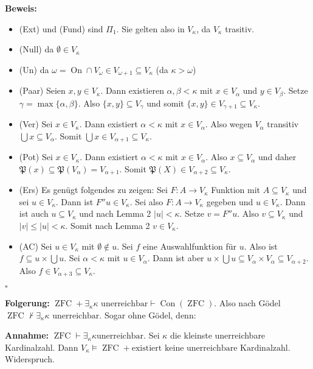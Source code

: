 \documentclass[a4paper,fontsize=11pt]{scrartcl}
\newcommand{\ZFC}{\operatorname{ZFC}}
\newcommand{\Con}{\operatorname{Con}}
\newcommand{\On}{\operatorname{On}}
\begin{document}
{\bf Beweis:}
\begin{itemize}
\item (Ext) und (Fund) sind $\Pi_1$. Sie gelten also in $V_\kappa$, da
  $V_\kappa$ trasitiv.
\item (Null) da $\emptyset\in V_\kappa$
\item (Un) da $\omega=\On\cap V_\omega \in V_{\omega+1}\subseteq
  V_\kappa$ (da $\kappa>\omega$)
\item (Paar) Seien $x,y\in V_\kappa$. Dann existieren
  $\alpha,\beta<\kappa$ mit $x\in V_\alpha$ und $y\in V_\beta$. Setze
  $\gamma=\max\{\alpha,\beta\}$. Also $\{x,y\}\subseteq V_\gamma$ und
  somit $\{x,y\}\in V_{\gamma+1}\subseteq V_\kappa$.
\item (Ver) Sei $x\in V_\kappa$. Dann existiert $\alpha<\kappa$ mit
  $x\in V_\alpha$. Also wegen $V_\alpha$ transitiv $\bigcup x\subseteq
  V_\alpha$. Somit $\bigcup x\in V_{\alpha+1}\subseteq V_\kappa$.
\item (Pot) Sei $x\in V_\kappa$. Dann existiert $\alpha<\kappa$ mit
  $x\in V_\alpha$. Also $x\subseteq V_\alpha$ und daher
  $\mathfrak{P}(x)\subseteq\mathfrak{P}(V_\alpha)=V_{\alpha+1}$. Somit
  $\mathfrak{P}(X)\in V_{\alpha+2}\subseteq V_\kappa$.
\item (Ers) Es genügt folgendes zu zeigen: Sei $F:A\rightarrow
  V_\kappa$ Funktion mit $A\subseteq V_\kappa$ und sei $u\in
  V_\kappa$. Dann ist $F''u\in V_\kappa$. Sei also $F:A\rightarrow
  V_\kappa$ gegeben und $u\in V_\kappa$. Dann ist auch $u\subseteq
  V_\kappa$ und nach Lemma 2 $|u|<\kappa$. Setze $v=F''u$. Also
  $v\subseteq V_\kappa$ und $|v|\le |u|<\kappa$. Somit nach Lemma 2
  $v\in V_\kappa$.
\item (AC) Sei $u\in V_\kappa$ mit $\emptyset\not\in u$. Sei $f$ eine
  Auswahlfunktion für $u$. Also ist $f\subseteq u\times\bigcup u$. Sei
  $\alpha<\kappa$ mit $u\in V_\alpha$. Dann ist aber $u\times\bigcup
  u\subseteq V_\alpha\times V_\alpha\subseteq V_{\alpha+2}$. Also
  $f\in V_{\alpha+3}\subseteq V_\kappa$.
\end{itemize}
\hfill $\square$

{\bf Folgerung:} $\ZFC + \exists_\kappa \kappa\mbox{ unerreichbar
}\vdash \Con(\ZFC)$. Also nach Gödel
$\ZFC\not\vdash\exists_\kappa\kappa\mbox{ unerreichbar}$. Sogar ohne
Gödel, denn:

{\bf Annahme:} $\ZFC\vdash\exists_\kappa\kappa\mbox{
  unerreichbar}$. Sei $\kappa$ die kleinste unerreichbare
Kardinalzahl. Dann $V_\kappa\models\ZFC+\mbox{existiert keine
  unerreichbare Kardinalzahl}$. Widerspruch.
\end{document}
